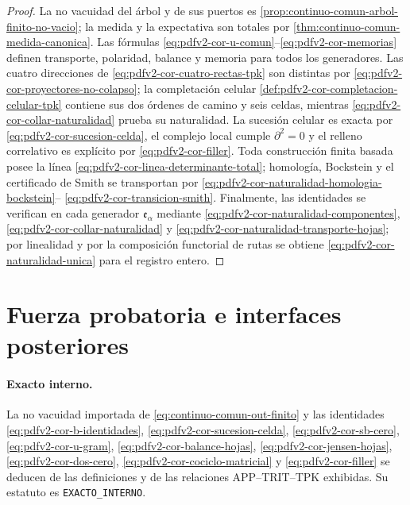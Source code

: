 \begin{proof}
La no vacuidad del árbol y de sus puertos es
\cref{prop:continuo-comun-arbol-finito-no-vacio}; la medida y la expectativa
son totales por \cref{thm:continuo-comun-medida-canonica}. Las fórmulas
  \eqref{eq:pdfv2-cor-u-comun}--\eqref{eq:pdfv2-cor-memorias} definen transporte,
polaridad, balance y memoria para todos los generadores. Las cuatro
  direcciones de \eqref{eq:pdfv2-cor-cuatro-rectas-tpk} son distintas por
  \eqref{eq:pdfv2-cor-proyectores-no-colapso}; la completación celular
  \cref{def:pdfv2-cor-completacion-celular-tpk} contiene sus dos órdenes de
  camino y seis celdas, mientras
  \eqref{eq:pdfv2-cor-collar-naturalidad} prueba su naturalidad. La
sucesión celular es exacta por \eqref{eq:pdfv2-cor-sucesion-celda}, el
complejo local cumple \(\partial^2=0\) y el relleno correlativo es explícito por
\eqref{eq:pdfv2-cor-filler}. Toda construcción finita basada posee la línea
\eqref{eq:pdfv2-cor-linea-determinante-total}; homología, Bockstein y el
certificado de Smith se transportan por
\eqref{eq:pdfv2-cor-naturalidad-homologia-bockstein}--
\eqref{eq:pdfv2-cor-transicion-smith}. Finalmente, las identidades se
verifican en cada generador \(\mathfrak e_\alpha\) mediante
\eqref{eq:pdfv2-cor-naturalidad-componentes},
\eqref{eq:pdfv2-cor-collar-naturalidad} y
\eqref{eq:pdfv2-cor-naturalidad-transporte-hojas}; por linealidad y por la
composición functorial de rutas se obtiene
\eqref{eq:pdfv2-cor-naturalidad-unica} para el registro entero.
\end{proof}

\section{Fuerza probatoria e interfaces posteriores}

\paragraph{Exacto interno.}
La no vacuidad importada de \eqref{eq:continuo-comun-out-finito} y las
identidades
\eqref{eq:pdfv2-cor-b-identidades},
\eqref{eq:pdfv2-cor-sucesion-celda},
\eqref{eq:pdfv2-cor-sb-cero},
\eqref{eq:pdfv2-cor-u-gram},
\eqref{eq:pdfv2-cor-balance-hojas},
\eqref{eq:pdfv2-cor-jensen-hojas},
\eqref{eq:pdfv2-cor-dos-cero},
\eqref{eq:pdfv2-cor-cociclo-matricial} y
\eqref{eq:pdfv2-cor-filler} se deducen de las definiciones y de las relaciones
APP--TRIT--TPK exhibidas. Su estatuto es
\texttt{EXACTO\_INTERNO}.

